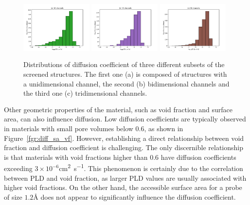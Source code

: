 \documentclass[main]{subfiles}
\begin{document}
\begin{figure}[ht]
  \centering
    \includegraphics[width=0.32\textwidth]{figures/5-diffusion/histogram_chan1D.pdf}
    \includegraphics[width=0.32\textwidth]{figures/5-diffusion/histogram_chan2D.pdf}
    \includegraphics[width=0.32\textwidth]{figures/5-diffusion/histogram_chan3D.pdf}
    \caption{ Distributions of diffusion coefficient of three different subsets of the screened structures. The first one (a) is composed of structures with a unidimensional channel, the second (b) bidimensional channels and the third one (c) tridimensional channels. }\label{fgr:hist_diffusion_chandim}
\end{figure}

Other geometric properties of the material, such as void fraction and surface area, can also influence diffusion. Low diffusion coefficients are typically observed in materials with small pore volumes below $0.6$, as shown in Figure~\ref{fgr:diff_sa_vf}. However, establishing a direct relationship between void fraction and diffusion coefficient is challenging. The only discernible relationship is that materials with void fractions higher than $0.6$ have diffusion coefficients exceeding $3\times 10^{-6}$\si{\square\cm\per\s}. This phenomenon is certainly due to the correlation between PLD and void fraction, as larger PLD values are usually associated with higher void fractions. On the other hand, the accessible surface area for a probe of size $1.2$\si{\angstrom} does not appear to significantly influence the diffusion coefficient.
\end{document}
